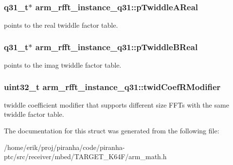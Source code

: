 \subsubsection[{\texorpdfstring{p\+Twiddle\+A\+Real}{pTwiddleAReal}}]{\setlength{\rightskip}{0pt plus 5cm}q31\+\_\+t$\ast$ arm\+\_\+rfft\+\_\+instance\+\_\+q31\+::p\+Twiddle\+A\+Real}\hypertarget{structarm__rfft__instance__q31_a2a0c944e66bab92fcbe19d1c29153250}{}\label{structarm__rfft__instance__q31_a2a0c944e66bab92fcbe19d1c29153250}
points to the real twiddle factor table. 
\subsubsection[{\texorpdfstring{p\+Twiddle\+B\+Real}{pTwiddleBReal}}]{\setlength{\rightskip}{0pt plus 5cm}q31\+\_\+t$\ast$ arm\+\_\+rfft\+\_\+instance\+\_\+q31\+::p\+Twiddle\+B\+Real}\hypertarget{structarm__rfft__instance__q31_ae5070be4c2e0327e618f5e1f4c5b9d80}{}\label{structarm__rfft__instance__q31_ae5070be4c2e0327e618f5e1f4c5b9d80}
points to the imag twiddle factor table. 
\subsubsection[{\texorpdfstring{twid\+Coef\+R\+Modifier}{twidCoefRModifier}}]{\setlength{\rightskip}{0pt plus 5cm}uint32\+\_\+t arm\+\_\+rfft\+\_\+instance\+\_\+q31\+::twid\+Coef\+R\+Modifier}\hypertarget{structarm__rfft__instance__q31_a6fc90252b579f7c29e01bd279334fc43}{}\label{structarm__rfft__instance__q31_a6fc90252b579f7c29e01bd279334fc43}
twiddle coefficient modifier that supports different size F\+F\+Ts with the same twiddle factor table. 

The documentation for this struct was generated from the following file\+:\begin{DoxyCompactItemize}
\item 
/home/erik/proj/piranha/code/piranha-\/ptc/src/receiver/mbed/\+T\+A\+R\+G\+E\+T\+\_\+\+K64\+F/arm\+\_\+math.\+h\end{DoxyCompactItemize}
